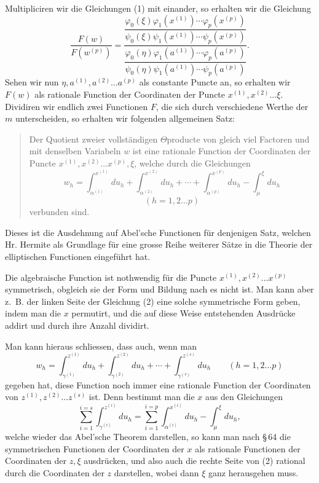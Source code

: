 \documentclass[10pt]{article}
\begin{document}
Multipliciren wir die Gleichungen (1) mit einander, so erhalten wir die Gleichung
\[
\tag{2}
\frac{F(w)}{F(w^{(p)})}=\frac{
\dfrac{\varphi_0(\xi)\varphi_1(x^{(1)})\cdots\varphi_p(x^{(p)})}{\psi_0(\xi)\psi_1(x^{(1)})\cdots\psi_p(x^{(p)})}}
{\dfrac{\varphi_0(\eta)\varphi_1(a^{(1)})\cdots\varphi_p(a^{(p)})}{\psi_0(\eta)\psi_1(a^{(1)})\cdots\psi_p(a^{(p)})}}.
\]
Sehen wir nun \(\eta,a^{(1)},a^{(2)}\ldots a^{(p)}\) als constante Puncte an, so erhalten wir \(F(w)\) als rationale Function der Coordinaten der Puncte \(x^{(1)},x^{(2)}\ldots\xi\). Dividiren wir endlich zwei Functionen \(F\), die sich durch verschiedene Werthe der \(m\) unterscheiden, so erhalten wir folgenden allgemeinen Satz:

\begin{quote}
Der Quotient zweier vollständigen \(\Theta\)producte von gleich viel Factoren und mit denselben Variabeln \(w\) ist eine rationale Function der Coordinaten der Puncte \(x^{(1)},x^{(2)}\ldots x^{(p)},\xi\), welche durch die Gleichungen
\[
w_h=\int_{\alpha^{(1)}}^{x^{(1)}}du_h+
\int_{\alpha^{(2)}}^{x^{(2)}}du_h+\cdots+
\int_{\alpha^{(p)}}^{x^{(p)}}du_h-
\int_{\mu}^{\xi}du_h
\]
\[(h=1,2\ldots p)
\]
verbunden sind.
\end{quote}

Dieses ist die Ausdehnung auf Abel'sche Functionen für denjenigen Satz, welchen Hr. Hermite als Grundlage für eine grosse Reihe weiterer Sätze in die Theorie der elliptischen Functionen eingeführt hat.

Die algebraische Function ist nothwendig für die Puncte \(x^{(1)},x^{(2)}\ldots x^{(p)}\) symmetrisch, obgleich sie der Form und Bildung nach es nicht ist. Man kann aber z.~B. der linken Seite der Gleichung (2) eine solche symmetrische Form geben, indem man die \(x\) permutirt, und die auf diese Weise entstehenden Ausdrücke addirt und durch ihre Anzahl dividirt.

Man kann hieraus schliessen, dass auch, wenn man
\[
w_h=\int_{\gamma^{(1)}}^{z^{(1)}}du_h+
\int_{\gamma^{(2)}}^{z^{(2)}}du_h+\cdots+
\int_{\gamma^{(s)}}^{z^{(s)}}du_h\qquad(h=1,2\ldots p)
\]
gegeben hat, diese Function noch immer eine rationale Function der Coordinaten von \(z^{(1)},z^{(2)}\ldots z^{(s)}\) ist. Denn bestimmt man die \(x\) aus den Gleichungen
\[
\sum_{i=1}^{i=s}\int_{\gamma^{(i)}}^{z^{(i)}}du_h=\sum_{i=1}^{i=p}\int_{\alpha^{(i)}}^{x^{(i)}}du_h-\int_{\mu}^{\xi}du_h,
\]
welche wieder das Abel'sche Theorem darstellen, so kann man nach \S\,64 die symmetrischen Functionen der Coordinaten der \(x\) als rationale Functionen der Coordinaten der \(z,\xi\) ausdrücken, und also auch die rechte Seite von (2) rational durch die Coordinaten der \(z\) darstellen, wobei dann \(\xi\) ganz herausgehen muss.
\end{document}
